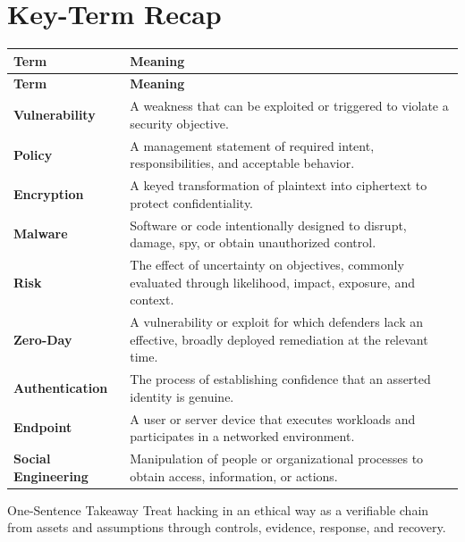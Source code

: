 \documentclass[11pt,letterpaper]{article}
\begin{document}
\section*{Key-Term Recap}
\begin{longtable}{>{\raggedright\arraybackslash}p{}>{\raggedright\arraybackslash}p{}}
\toprule\rowcolor{Navy}\color{white}\textbf{Term} & \color{white}\textbf{Meaning}\\\midrule
\endfirsthead
\toprule\rowcolor{Navy}\color{white}\textbf{Term} & \color{white}\textbf{Meaning}\\\midrule
\endhead
\textbf{Vulnerability} & A weakness that can be exploited or triggered to violate a security objective. \\\midrule
\textbf{Policy} & A management statement of required intent, responsibilities, and acceptable behavior. \\\midrule
\textbf{Encryption} & A keyed transformation of plaintext into ciphertext to protect confidentiality. \\\midrule
\textbf{Malware} & Software or code intentionally designed to disrupt, damage, spy, or obtain unauthorized control. \\\midrule
\textbf{Risk} & The effect of uncertainty on objectives, commonly evaluated through likelihood, impact, exposure, and context. \\\midrule
\textbf{Zero-Day} & A vulnerability or exploit for which defenders lack an effective, broadly deployed remediation at the relevant time. \\\midrule
\textbf{Authentication} & The process of establishing confidence that an asserted identity is genuine. \\\midrule
\textbf{Endpoint} & A user or server device that executes workloads and participates in a networked environment. \\\midrule
\textbf{Social Engineering} & Manipulation of people or organizational processes to obtain access, information, or actions. \\\midrule
\bottomrule
\end{longtable}
\begin{CornellExamBox}{One-Sentence Takeaway}
Treat hacking in an ethical way as a verifiable chain from assets and assumptions through controls, evidence, response, and recovery.
\end{CornellExamBox}
\end{document}
